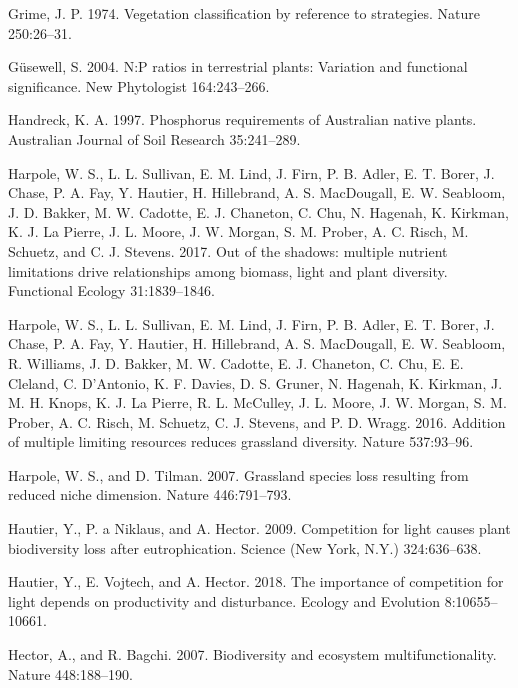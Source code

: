 \documentclass[twoside,12pt,final]{ucthesis-CA2012}
\begin{document}
\begin{ucmainmatter}
\leavevmode\hypertarget{ref-Grime1974}{}%
Grime, J. P. 1974. Vegetation classification by reference to strategies. Nature 250:26--31.

\leavevmode\hypertarget{ref-Gusewell2004}{}%
Güsewell, S. 2004. N:P ratios in terrestrial plants: Variation and functional significance. New Phytologist 164:243--266.

\leavevmode\hypertarget{ref-Handreck1997}{}%
Handreck, K. A. 1997. Phosphorus requirements of Australian native plants. Australian Journal of Soil Research 35:241--289.

\leavevmode\hypertarget{ref-Harpole2017}{}%
Harpole, W. S., L. L. Sullivan, E. M. Lind, J. Firn, P. B. Adler, E. T. Borer, J. Chase, P. A. Fay, Y. Hautier, H. Hillebrand, A. S. MacDougall, E. W. Seabloom, J. D. Bakker, M. W. Cadotte, E. J. Chaneton, C. Chu, N. Hagenah, K. Kirkman, K. J. La Pierre, J. L. Moore, J. W. Morgan, S. M. Prober, A. C. Risch, M. Schuetz, and C. J. Stevens. 2017. Out of the shadows: multiple nutrient limitations drive relationships among biomass, light and plant diversity. Functional Ecology 31:1839--1846.

\leavevmode\hypertarget{ref-Harpole2016}{}%
Harpole, W. S., L. L. Sullivan, E. M. Lind, J. Firn, P. B. Adler, E. T. Borer, J. Chase, P. A. Fay, Y. Hautier, H. Hillebrand, A. S. MacDougall, E. W. Seabloom, R. Williams, J. D. Bakker, M. W. Cadotte, E. J. Chaneton, C. Chu, E. E. Cleland, C. D'Antonio, K. F. Davies, D. S. Gruner, N. Hagenah, K. Kirkman, J. M. H. Knops, K. J. La Pierre, R. L. McCulley, J. L. Moore, J. W. Morgan, S. M. Prober, A. C. Risch, M. Schuetz, C. J. Stevens, and P. D. Wragg. 2016. Addition of multiple limiting resources reduces grassland diversity. Nature 537:93--96.

\leavevmode\hypertarget{ref-Harpole2007}{}%
Harpole, W. S., and D. Tilman. 2007. Grassland species loss resulting from reduced niche dimension. Nature 446:791--793.

\leavevmode\hypertarget{ref-Hautier2009}{}%
Hautier, Y., P. a Niklaus, and A. Hector. 2009. Competition for light causes plant biodiversity loss after eutrophication. Science (New York, N.Y.) 324:636--638.

\leavevmode\hypertarget{ref-Hautier2018}{}%
Hautier, Y., E. Vojtech, and A. Hector. 2018. The importance of competition for light depends on productivity and disturbance. Ecology and Evolution 8:10655--10661.

\leavevmode\hypertarget{ref-Hector2007}{}%
Hector, A., and R. Bagchi. 2007. Biodiversity and ecosystem multifunctionality. Nature 448:188--190.


\end{ucmainmatter}
\end{document}
